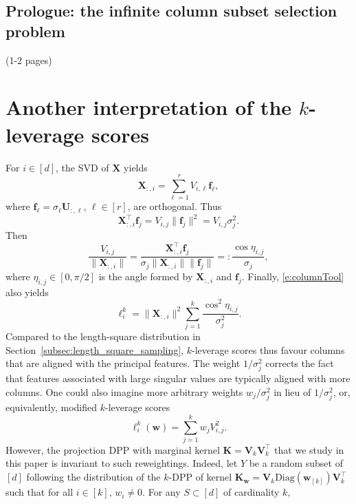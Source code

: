 \documentclass[twoside,11pt]{book}
\numberwithin{theorem}{chapter}
\numberwithin{definition}{chapter}
\numberwithin{proposition}{chapter}
\numberwithin{corollary}{chapter}
\numberwithin{example}{chapter}
\numberwithin{lemma}{chapter}
\DeclareMathOperator{\Tran}{\intercal}
\begin{document}
\subsection{Prologue: the infinite column subset selection problem} (1-2 pages)



\section{Another interpretation of the $k$-leverage scores}
\label{app:statisticalInterpretationOfLVSs}


For $i \in [d]$, the SVD of $\bm{X}$ yields
\begin{equation}
\bm{X}_{:,i} = \sum_{\ell = 1}^{r}V_{i,\ell}\bm{f}_{\ell},
\end{equation}
where $\bm{f}_{\ell} = \sigma_{\ell}\bm{U}_{:,\ell}$, $\ell\in[r]$, are orthogonal.
Thus
\begin{equation}
\bm{X}_{:,i}^{\Tran}\bm{f}_{j} = V_{i,j} \|\bm{f}_{j}\|^{2} = V_{i,j} \sigma_{j}^{2}.
\label{e:columnTool}
\end{equation}
Then
\begin{equation}
 \frac{V_{i,j}}{\|\bm{X}_{:,i}\|} = \frac{\bm{X}_{:,i}^{\Tran}\bm{f}_{j}}{\sigma_{j}\|\bm{X}_{:,i}\|\|\bm{f}_{j}\|} =:  \frac{\cos \eta_{i,j}}{\sigma_{j}},
\end{equation}
where $\eta_{i,j}\in[0,\pi/2]$ is the angle formed by $\bm{X}_{:,i}$ and $\bm{f}_j$. Finally, \eqref{e:columnTool} also yields
\begin{equation}
\ell^{k}_{i} = \|\bm{X}_{:,i}\|^{2} \sum_{j=1}^{k} \frac{\cos^2\eta_{i,j}}{\sigma_{j}^{2}}.
\end{equation}
Compared to the length-square distribution in Section~\ref{subsec:length_square_sampling}, $k$-leverage scores thus favour columns that are aligned with the principal features. The weight $1/\sigma_j^2$ corrects the fact that features associated with large singular values are typically aligned with more columns. One could also imagine more arbitrary weights $w_j/\sigma_j^2$ in lieu of $1/\sigma_j^2$, or, equivalently, modified $k$-leverage scores
$$\ell_i^k(\bm{w}) = \sum_{j=1}^k w_{j}V_{i,j}^2.$$
However, the projection DPP with marginal kernel $\bm{K} = \bm{V}^{}_{k}\bm{V}_{k}^{\Tran}$ that we study in this paper is invariant to such reweightings. Indeed,  let $Y$ be a random subset of $[d]$ following the distribution of the $k$-DPP of kernel $\bm{K}_{\bm{w}} = \bm{V}^{}_{k}\text{Diag}(\bm{w}_{[k]})\bm{V}_{k}^{\Tran}$ such that for all $i \in [k]$, $w_{i} \neq 0$. For any $S\subset [d]$ of cardinality $k$,
\end{document}
